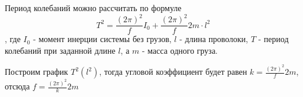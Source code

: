 \documentclass[a4paper, 12pt]{article}
\begin{document}
			\begin{figure}[h]
			\end{figure}
			
			Период колебаний можно рассчитать по формуле
			$$T^2=\frac{(2 \pi)^2}{f} I_0 + \frac{(2 \pi)^2}{f} 2m \cdot l^2$$, где $I_0$ - момент инерции системы без грузов, $l$ - длина проволоки, $T$ - период колебаний при заданной длине $l$, а $m$ - масса одного груза.
					
			Построим график $T^2(l^2)$, тогда угловой коэффициент будет равен $k=\frac{(2 \pi)^2}{f} 2m$, отсюда $f=\frac{(2 \pi)^2}{k} 2m$
			
\end{document}

